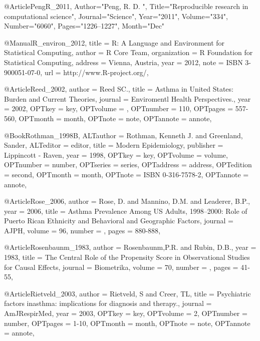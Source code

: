 {{{%


@Article{PengR_2011,
   Author="Peng, R. D. ",
   Title="{{R}eproducible research in computational science}",
   Journal="Science",
   Year="2011",
   Volume="334",
   Number="6060",
   Pages="1226--1227",
   Month="Dec"
}




@Manual{R_environ_2012,
    title = {R: A Language and Environment for Statistical Computing},
    author = {{R Core Team}},
    organization = {R Foundation for Statistical Computing},
    address = {Vienna, Austria},
    year = {2012},
    note = {{ISBN} 3-900051-07-0},
    url = {http://www.R-project.org/},
  }


@Article{Reed_2002,
author = {Reed SC.},
title = {Asthma in United States: Burden and Current Theories},
journal = {Enviromentl Health Perspectives.},
year = {2002},
OPTkey = {key},
OPTvolume = {},
OPTnumber = {110},
OPTpages = {557-560},
OPTmonth = {month},
OPTnote = {note},
OPTannote = {annote},
}


@Book{Rothman_1998B,
ALTauthor = {Rothman, Kenneth J. and Greenland, Sander},
ALTeditor = {editor},
title = {Modern Epidemiology},
publisher = {Lippincott - Raven},
year = {1998},
OPTkey = {key},
OPTvolume = {volume},
OPTnumber = {number},
OPTseries = {series},
OPTaddress = {address},
OPTedition = {second},
OPTmonth = {month},
OPTnote = {{ISBN} 0-316-7578-2},
OPTannote = {annote},
}


@Article{Rose_2006,
  author = {Rose, D. and Mannino, D.M. and Leaderer, B.P.},
  year = {2006},
  title = {Asthma Prevalence Among US Adults, 1998–2000: Role of Puerto Rican Ethnicity and Behavioral and Geographic Factors},
  journal = AJPH,
  volume =  {96},
  number = {},
  pages = {880-888},
}

@Article{Rosenbaunm_1983,
  author = {Rosenbaunm,P.R. and Rubin, D.B.},
  year = {1983},
  title = {The Central Role of the Propensity Score in Observational Studies for Causal Effects},
  journal = {Biometrika},
  volume =  {70},
  number = {},
  pages = {41-55},
}

@Article{Rietveld_2003,
author = {Rietveld, S and Creer, TL},
title = {Psychiatric factors inasthma: implications for diagnosis and therapy.},
journal = {AmJRespirMed},
year = {2003},
OPTkey = {key},
OPTvolume = {2},
OPTnumber = {number},
OPTpages = {1-10},
OPTmonth = {month},
OPTnote = {note},
OPTannote = {annote},
}

}}}
